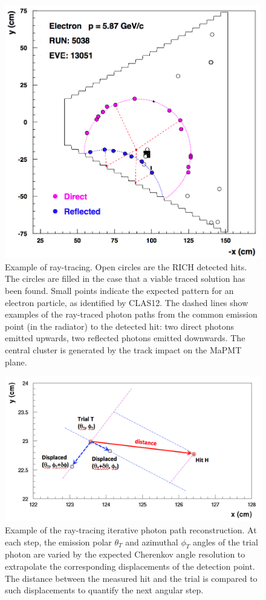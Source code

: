 \begin{figure}[t]
\begin{center}
\includegraphics[width=0.8\columnwidth]{pics/example.png}
\end{center}
\caption{Example of ray-tracing. Open circles are the RICH detected hits. The circles are filled in the case that a viable traced solution has been found. Small points indicate the expected pattern for an electron particle, as identified by CLAS12. The dashed lines show examples of the ray-traced photon paths from the common emission point (in the radiator) to the detected hit: two direct photons emitted upwards, two reflected photons emitted downwards. The central cluster is generated by the track impact on the MaPMT plane.}
\label{Fig:RayShow}
\end{figure}

\begin{figure}[t]
\begin{center}
\includegraphics[width=1.0\columnwidth]{pics/ray_trace_example.png}
\end{center}
\caption{Example of the ray-tracing iterative photon path reconstruction. At each step, the emission polar $\theta_T$ and azimuthal $\phi_T$ angles of the trial photon are varied by the expected Cherenkov angle resolution to extrapolate the corresponding displacements of the detection point. The distance between the measured hit and the trial is compared to such displacements to quantify the next angular step.}
\label{Fig:RayAlgo}
\end{figure}


